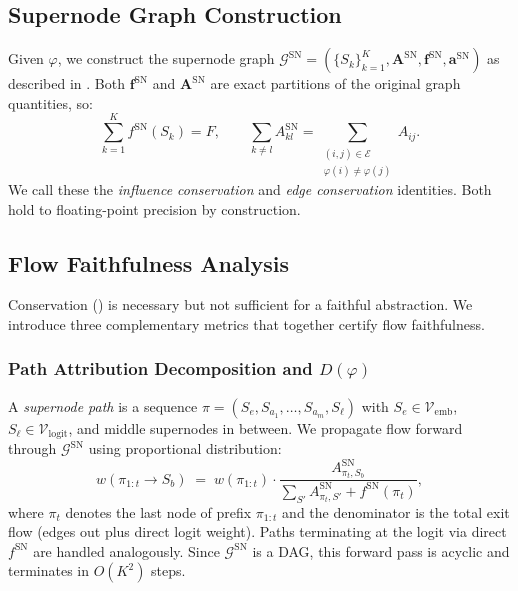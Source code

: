 \documentclass[11pt]{article}
\newcommand{\cG}{\mathcal{G}}
\newcommand{\cV}{\mathcal{V}}
\newcommand{\cE}{\mathcal{E}}
\newcommand{\1}{\mathbbm{1}}
\newcommand{\snAdj}{\mathbf{A}^{\mathrm{SN}}}
\newcommand{\snInf}{\mathbf{f}^{\mathrm{SN}}}
\newcommand{\snAct}{\mathbf{a}^{\mathrm{SN}}}
\begin{document}
\subsection{Supernode Graph Construction}
\label{sec:sn-graph}

Given $\varphi$, we construct the supernode graph $\cG^{\mathrm{SN}} = (\{S_k\}_{k=1}^K, \snAdj, \snInf, \snAct)$ as described in .
Both $\snInf$ and $\snAdj$ are exact partitions of the original graph quantities, so:
\begin{equation}
  \sum_{k=1}^K f^{\mathrm{SN}}(S_k) = F, \qquad
  \sum_{k \ne l} A^{\mathrm{SN}}_{kl} = \sum_{\substack{(i,j) \in \cE \\ \varphi(i) \ne \varphi(j)}} A_{ij}.
  \label{eq:conservation}
\end{equation}
We call these the \emph{influence conservation} and \emph{edge conservation} identities.
Both hold to floating-point precision by construction.

\subsection{Flow Faithfulness Analysis}
\label{sec:flow-analysis}

Conservation () is necessary but not sufficient for a faithful abstraction.
We introduce three complementary metrics that together certify flow faithfulness.

\subsubsection{Path Attribution Decomposition and $D(\varphi)$}
\label{sec:path-decomp}

A \emph{supernode path} is a sequence $\pi = (S_{e}, S_{a_1}, \ldots, S_{a_m}, S_{\ell})$ with $S_e \in \cV_{\mathrm{emb}}$, $S_\ell \in \cV_{\mathrm{logit}}$, and middle supernodes in between.
We propagate flow forward through $\cG^{\mathrm{SN}}$ using proportional distribution:
\begin{equation}
  w(\pi_{1:t} \to S_b) \;=\; w(\pi_{1:t}) \cdot \frac{A^{\mathrm{SN}}_{\pi_t, S_b}}{\displaystyle\sum_{S'} A^{\mathrm{SN}}_{\pi_t, S'} + f^{\mathrm{SN}}(\pi_t)},
  \label{eq:flow-prop}
\end{equation}
where $\pi_t$ denotes the last node of prefix $\pi_{1:t}$ and the denominator is the total exit flow (edges out plus direct logit weight).
Paths terminating at the logit via direct $f^{\mathrm{SN}}$ are handled analogously.
Since $\cG^{\mathrm{SN}}$ is a DAG, this forward pass is acyclic and terminates in $O(K^2)$ steps.
\end{document}
